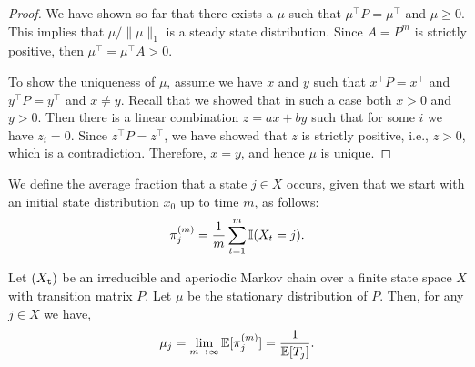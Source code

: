 \begin{proof}
%
%

We have shown so far that there exists a $\mu$ such that $\mu^\top
P=\mu^\top$ and $\mu\geq 0$. This implies that $\mu/\|\mu\|_1$ is a steady state distribution.
Since $A=P^m$ is strictly positive,
then $\mu^\top=\mu^\top A >0$.

To show the uniqueness of $\mu$, assume we have $x$ and $y$ such
that $x^\top P=x^\top$ and $y^\top P=y^\top$ and $x\neq y$. Recall
that we showed that in such a case both $x>0$ and $y>0$. Then there
is a linear combination $z=ax+by$ such that for some $i$ we have
$z_i=0$. Since $z^\top P=z^\top$, we have showed that $z$ is
strictly positive, i.e., $z>0$, which is a contradiction. Therefore,
$x=y$, and hence $\mu$ is unique.
\end{proof}

We define the average fraction that a state $j\in X$ occurs, given
that we start with an initial state distribution $x_0$ up to time $m$,  as follows:
\[
\pi^{(m)}_j=\frac{1}{m}\sum_{t=1}^m \mathbb{I} (X_t=j).
\]

\begin{theorem}\label{thm:MC_expected_return_time}
Let $({X_{\tt t}})$ be an irreducible and  aperiodic Markov chain
over a finite state space $X$ with transition matrix $P$. Let $\mu$
be the stationary distribution of $P$. Then, for any $j\in X$ we have,
\[
\mu_j=\lim_{m\rightarrow\infty} \mathbb{E}[\pi^{(m)}_j] =\frac{1}{\mathbb{E}[T_j]}.
\]
\end{theorem}

